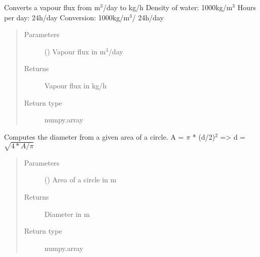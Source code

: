 \documentclass[letterpaper,10pt,english]{sphinxmanual}
\begin{document}

\begin{fulllineitems}
\label{\detokenize{air:livestock.air.convert_vapour_flux_to_kgh}}
Converts a vapour flux from m$^{\text{3}}$/day to kg/h
Density of water: 1000kg/m$^{\text{3}}$    Hours per day: 24h/day
Conversion: 1000kg/m$^{\text{3}}$/ 24h/day
\begin{quote}\begin{description}
\item[{Parameters}] \leavevmode
{} () \textendash{} Vapour flux in m$^{\text{3}}$/day

\item[{Returns}] \leavevmode
Vapour flux in kg/h

\item[{Return type}] \leavevmode
numpy.array

\end{description}\end{quote}

\end{fulllineitems}


\begin{fulllineitems}
\label{\detokenize{air:livestock.air.diameter_from_area}}
Computes the diameter from a given area of a circle.
A = \({\pi}\) * (d/2)$^{\text{2}}$ =\textgreater{}
d = \({\sqrt{4*A/{\pi}}}\)
\begin{quote}\begin{description}
\item[{Parameters}] \leavevmode
{} () \textendash{} Area of a circle in m

\item[{Returns}] \leavevmode
Diameter in m

\item[{Return type}] \leavevmode
numpy.array

\end{description}\end{quote}

\end{fulllineitems}
\end{document}
